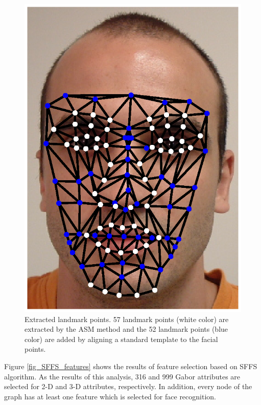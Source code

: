 \begin{figure}[tbp]
\begin{center}
\includegraphics[width = 6.0in, ]{./chapters/figures/109_57_features.eps}
\caption{Extracted landmark points. 57 landmark points (white color)
are extracted by the ASM method and the 52 landmark points (blue
color) are added by aligning a standard template to the facial
points.}\label{fig_landmark_points}
\end{center}
\end{figure}

Figure \ref{fig_SFFS_features} shows the results of feature
selection based on SFFS algorithm. As the results of this analysis,
316 and 999 Gabor attributes are selected for 2-D and 3-D
attributes, respectively. In addition, every node of the graph has
at least one feature which is selected for face recognition.

